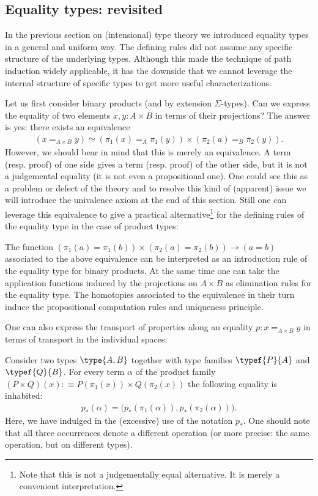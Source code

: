 \subsection{Equality types: revisited}

    In the previous section on (intensional) type theory we introduced equality types in a general and uniform way. The defining rules did not assume any specific structure of the underlying types. Although this made the technique of path induction widely applicable, it has the downside that we cannot leverage the internal structure of specific types to get more useful characterizations.

    Let us first consider binary products (and by extension $\Sigma$-types). Can we express the equality of two elements $x,y:A\times B$ in terms of their projections? The answer is yes: there exists an equivalence
    \begin{gather}
        (x=_{A\times B}y)\simeq(\pi_1(x)=_A\pi_1(y))\times(\pi_2(a)=_B\pi_2(y)).
    \end{gather}
    However, we should bear in mind that this is merely an equivalence. A term (resp. proof) of one side gives a term (resp. proof) of the other side, but it is not a judgemental equality (it is not even a propositional one). One could see this as a problem or defect of the theory and to resolve this kind of (apparent) issue we will introduce the univalence axiom at the end of this section. Still one can leverage this equivalence to give a practical alternative\footnote{Note that this is not a judgementally equal alternative. It is merely a convenient interpretation.} for the defining rules of the equality type in the case of product types:
    \begin{remark}
        The function $(\pi_1(a)=\pi_1(b))\times(\pi_2(a)=\pi_2(b))\rightarrow(a=b)$ associated to the above equivalence can be interpreted as an introduction rule of the equality type for binary products. At the same time one can take the application functions induced by the projections on $A\times B$ as elimination rules for the equality type. The homotopies associated to the equivalence in their turn induce the propositional computation rules and uniqueness principle.
    \end{remark}

    One can also express the transport of properties along an equality $p:x=_{A\times B}y$ in terms of transport in the individual spaces:
    \begin{property}
        Consider two types $\type{A, B}$ together with type families $\typef{P}{A}$ and $\typef{Q}{B}$. For every term $\alpha$ of the product family $(P\times Q)(x):\equiv P(\pi_1(x))\times Q(\pi_2(x))$ the following equality is inhabited:
        \begin{gather}
            p_*(\alpha) = \big(p_*(\pi_1(\alpha)), p_*(\pi_2(\alpha))\big).
        \end{gather}
        Here, we have indulged in the (excessive) use of the notation $p_*$. One should note that all three occurrences denote a different operation (or more precise: the same operation, but on different types).
    \end{property}

